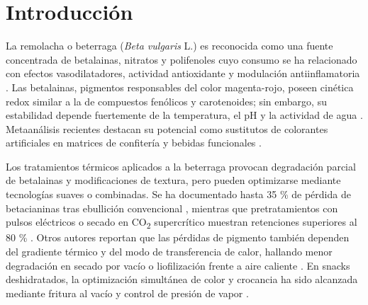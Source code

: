 \documentclass[manuscript,screen,review]{acmart}
\begin{document}



\maketitle
\section{Introducción}

   La remolacha o beterraga (\textit{Beta vulgaris} L.) es reconocida como una fuente concentrada de betalainas, nitratos y polifenoles cuyo consumo se ha relacionado con efectos vasodilatadores, actividad antioxidante y modulación antiinflamatoria \cite{Clifford2021,Siervo2016,WoottonBeard2011,Esatbeyoglu2015,Ninfali2013}.  Las betalainas, pigmentos responsables del color magenta-rojo, poseen cinética redox similar a la de compuestos fenólicos y carotenoides; sin embargo, su estabilidad depende fuertemente de la temperatura, el pH y la actividad de agua \cite{Stintzing2002,Wruss2015}.  Metaanálisis recientes destacan su potencial como sustitutos de colorantes artificiales en matrices de confitería y bebidas funcionales \cite{Neelwarne2013}.  

Los tratamientos térmicos aplicados a la beterraga provocan degradación parcial de betalainas y modificaciones de textura, pero pueden optimizarse mediante tecnologías suaves o combinadas.  Se ha documentado hasta 35 \% de pérdida de betacianinas tras ebullición convencional \cite{ArrudaRamos2017}, mientras que pretratamientos con pulsos eléctricos o secado en CO\textsubscript{2} supercrítico muestran retenciones superiores al 80 \% \cite{Nikan2019,Tomic2020}.  Otros autores reportan que las pérdidas de pigmento también dependen del gradiente térmico y del modo de transferencia de calor, hallando menor degradación en secado por vacío o liofilización frente a aire caliente \cite{Ravichandran2013,Nistor2017,Rocchetti2020}.  En snacks deshidratados, la optimización simultánea de color y crocancia ha sido alcanzada mediante fritura al vacío y control de presión de vapor \cite{Obreque2014,VieitesBarroso2023}.  
\end{document}
